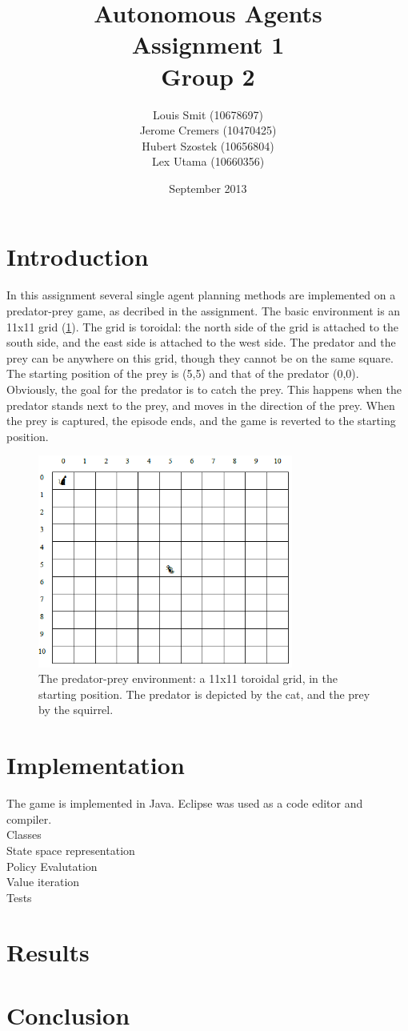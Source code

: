 \documentclass{article}
\title{Autonomous Agents \\ Assignment 1 \\ Group 2}
\author{Louis Smit (10678697) \\ Jerome Cremers (10470425) \\
Hubert Szostek (10656804) \\ Lex Utama (10660356)}
\date{September 2013}
\begin{document}
\maketitle

\section{Introduction}
In this assignment several single agent planning methods are implemented on a predator-prey game, as decribed in the assignment. The basic environment is an 11x11 grid (\ref{Grid}). The grid is
toroidal: the north side of the grid is attached to the south side, and the east side is attached to the west side. The predator and the prey can be anywhere on this grid, though they cannot be on the same square. The starting position of the prey is (5,5) and that of the predator (0,0).\\
Obviously, the goal for the predator is to catch the prey. This happens when the predator stands next to the prey, and moves in the direction of the prey. When the prey is captured, the episode ends, and the game is reverted to the starting position.

\begin{figure}[hb]
  \centering
  \includegraphics[width=3.3in]{Grid_world}
  \caption[Figure 1]
   {The predator-prey environment: a 11x11 toroidal grid, in the starting position. The predator is depicted by the cat, and the prey by the squirrel.}
   \label{Grid}
\end{figure}


\section{Implementation}
The game is implemented in Java. Eclipse was used as a code editor and compiler. \\
Classes\\
State space representation\\
Policy Evalutation\\
Value iteration\\
Tests\\

\section{Results}

\section{Conclusion}
\end{document}
